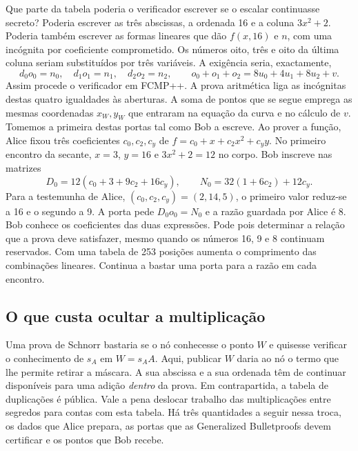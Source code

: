 Que parte da tabela poderia o verificador escrever se o escalar
continuasse secreto? Poderia escrever as três abscissas,
a ordenada 16 e a coluna \(3x^2+2\). Poderia também escrever as
formas lineares que dão \(f(x,16)\) e \(n\), com uma incógnita
por coeficiente comprometido. Os números oito, três e oito da
última coluna seriam substituídos por três variáveis. A exigência
seria, exactamente,
\[
 d_0o_0=n_0,\quad d_1o_1=n_1,\quad d_2o_2=n_2,\qquad
 o_0+o_1+o_2=8u_0+4u_1+8u_2+v .
\]
Assim procede o verificador em FCMP++. A prova aritmética liga
as incógnitas destas quatro igualdades às aberturas. A soma de
pontos que se segue emprega as mesmas coordenadas \(x_W,y_W\)
que entraram na equação da curva e no cálculo de \(v\).
Tomemos a primeira destas portas tal como Bob a escreve. Ao prover
a função, Alice fixou três coeficientes \(c_0,c_2,c_y\) de
\(f=c_0+x+c_2x^2+c_yy\). No primeiro encontro da secante, \(x=3\),
\(y=16\) e \(3x^2+2=12\) no corpo. Bob inscreve nas matrizes
\[
 D_0=12(c_0+3+9c_2+16c_y),\qquad
 N_0=32(1+6c_2)+12c_y.
\]
Para a testemunha de Alice, \((c_0,c_2,c_y)=(2,14,5)\), o primeiro
valor reduz-se a 16 e o segundo a 9. A porta pede \(D_0o_0=N_0\)
e a razão guardada por Alice é 8. Bob conhece os coeficientes das
duas expressões. Pode pois determinar a relação que a prova deve
satisfazer, mesmo quando os números 16, 9 e 8 continuam reservados.
Com uma tabela de 253 posições aumenta o comprimento das combinações
lineares. Continua a bastar uma porta para a razão em cada encontro.

\subsection{O que custa ocultar a multiplicação}
\label{sec:fcmp-divisor-costs}

Uma prova de Schnorr bastaria se o nó conhecesse o ponto \(W\)
e quisesse verificar o conhecimento de \(s_A\) em \(W=s_AA\).
Aqui, publicar \(W\) daria ao nó o termo que lhe permite retirar a
máscara. A sua abscissa e a sua ordenada têm de continuar disponíveis
para uma adição \emph{dentro} da prova. Em contrapartida, a tabela
de duplicações é pública. Vale a pena deslocar trabalho das
multiplicações entre segredos para contas com esta tabela. Há três
quantidades a seguir nessa troca, os dados que Alice prepara, as
portas que as Generalized Bulletproofs devem certificar e os
pontos que Bob recebe.

